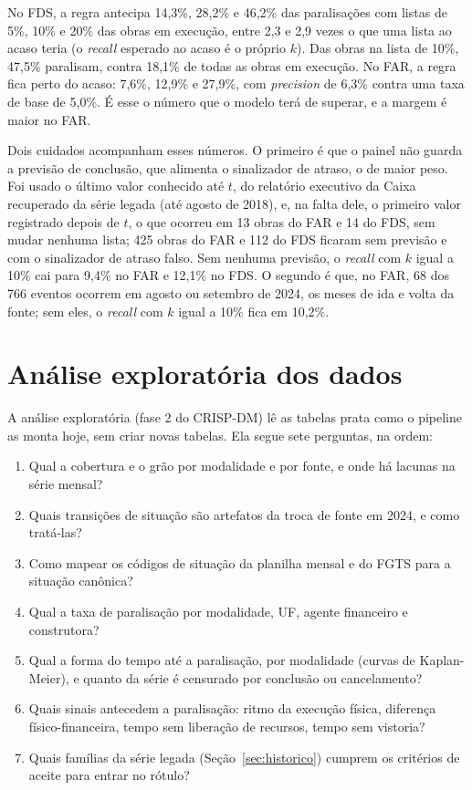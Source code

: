 No FDS, a regra antecipa 14,3\%, 28,2\% e 46,2\% das paralisações com listas de 5\%, 10\% e 20\% das obras em execução, entre 2,3 e 2,9 vezes o que uma lista ao acaso teria (o \textit{recall} esperado ao acaso é o próprio $k$). Das obras na lista de 10\%, 47,5\% paralisam, contra 18,1\% de todas as obras em execução. No FAR, a regra fica perto do acaso: 7,6\%, 12,9\% e 27,9\%, com \textit{precision} de 6,3\% contra uma taxa de base de 5,0\%. É esse o número que o modelo terá de superar, e a margem é maior no FAR.

Dois cuidados acompanham esses números. O primeiro é que o painel não guarda a previsão de conclusão, que alimenta o sinalizador de atraso, o de maior peso. Foi usado o último valor conhecido até $t$, do relatório executivo da Caixa recuperado da série legada (até agosto de 2018), e, na falta dele, o primeiro valor registrado depois de $t$, o que ocorreu em 13 obras do FAR e 14 do FDS, sem mudar nenhuma lista; 425 obras do FAR e 112 do FDS ficaram sem previsão e com o sinalizador de atraso falso. Sem nenhuma previsão, o \textit{recall} com $k$ igual a 10\% cai para 9,4\% no FAR e 12,1\% no FDS. O segundo é que, no FAR, 68 dos 766 eventos ocorrem em agosto ou setembro de 2024, os meses de ida e volta da fonte; sem eles, o \textit{recall} com $k$ igual a 10\% fica em 10,2\%.

\section{Análise exploratória dos dados}

A análise exploratória (fase 2 do CRISP-DM) lê as tabelas prata como o pipeline as monta hoje, sem criar novas tabelas. Ela segue sete perguntas, na ordem:

\begin{enumerate}
	\item Qual a cobertura e o grão por modalidade e por fonte, e onde há lacunas na série mensal?
	\item Quais transições de situação são artefatos da troca de fonte em 2024, e como tratá-las?
	\item Como mapear os códigos de situação da planilha mensal e do FGTS para a situação canônica?
	\item Qual a taxa de paralisação por modalidade, UF, agente financeiro e construtora?
	\item Qual a forma do tempo até a paralisação, por modalidade (curvas de Kaplan-Meier), e quanto da série é censurado por conclusão ou cancelamento?
	\item Quais sinais antecedem a paralisação: ritmo da execução física, diferença físico-financeira, tempo sem liberação de recursos, tempo sem vistoria?
	\item Quais famílias da série legada (Seção~\ref{sec:historico}) cumprem os critérios de aceite para entrar no rótulo?
\end{enumerate}

